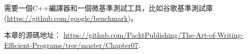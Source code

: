 需要一個C++編譯器和一個微基準測試工具，比如谷歌基準測試庫(\url{https://github.com/google/benchmark})。

本章的源碼地址： \url{https://github.com/PacktPublishing/The-Art-of-Writing-Efficient-Programs/tree/master/Chapter07}.